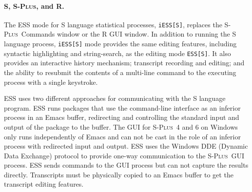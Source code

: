 \documentclass{article}
\newcommand*{\Splus}{\textsc{S-Plus}}
\newcommand{\stexttt}[1]{{\small\texttt{#1}}}
\newenvironment{Comment}{\begin{quote}\small\itshape }{\end{quote}}
\begin{document}
\paragraph{S, \Splus, and R.}
The ESS mode for S language statistical processes, \stexttt{iESS[S]},
replaces the \Splus\ Commands window or the R GUI window.  In addition
to running the S language process, \stexttt{iESS[S]} mode provides the
same editing features, including syntactic highlighting and
string-search, as the editing mode \stexttt{ESS[S]}.  It also provides
an interactive history mechanism; transcript recording and editing;
and the ability to resubmit the contents of a multi-line command to
the executing process with a single keystroke.

ESS uses two different approaches for communicating with the S
language program.  ESS runs packages that use the command-line interface
as an inferior process in an Emacs buffer,
redirecting and controlling the standard input and output of the
package to the buffer.
The GUI for \Splus\ 4 and 6 on Windows only runs independently of
Emacs and can not be cast in the role of an inferior process with
redirected input and output.
ESS uses the Windows DDE (Dynamic Data Exchange) protocol to provide 
one-way communication to the \Splus\ GUI process.  ESS sends commands
to the GUI process but can not capture
the results directly.
Transcripts must be physically copied to an Emacs buffer to get the
transcript editing features.
\end{document}
